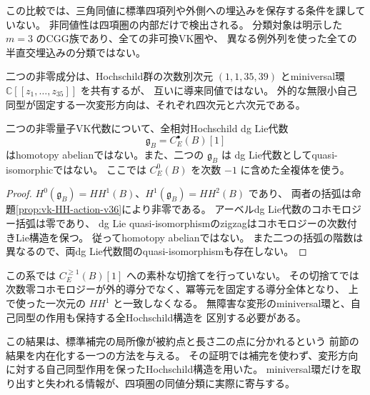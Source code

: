 この比較では、三角同値に標準四項列や外側への埋込みを保存する条件を課していない。
非同値性は四項圏の内部だけで検出される。
分類対象は明示した $m=3$ のCGG族であり、全ての非可換VK圏や、
異なる例外列を使った全ての半直交埋込みの分類ではない。

\begin{corollary}[同じ滑らかな変形環を持つ非同値なVK圏]
\label{cor:vk-same-hull-distinct-action-v36}
二つの非零成分は、Hochschild群の次数別次元
$(1,1,35,39)$ とminiversal環 $\mathbb C[[z_1,\ldots,z_{35}]]$ を共有するが、
互いに導来同値ではない。
外的な無限小自己同型が固定する一次変形方向は、それぞれ四次元と六次元である。
\end{corollary}

\begin{corollary}
\label{cor:vk-not-homotopy-abelian-v36}
二つの非零量子VK代数について、全相対Hochschild dg Lie代数
\[
 \mathfrak g_B=C_E^\bullet(B)[1]
\]
はhomotopy abelianではない。また、二つの $\mathfrak g_B$ は
 dg Lie代数としてquasi-isomorphicではない。
ここでは $C_E^0(B)$ を次数 $-1$ に含めた全複体を使う。
\end{corollary}

\begin{proof}
$H^0(\mathfrak g_B)=HH^1(B)$、$H^1(\mathfrak g_B)=HH^2(B)$ であり、
両者の括弧は命題\ref{prop:vk-HH-action-v36}により非零である。
アーベルdg Lie代数のコホモロジー括弧は零であり、
dg Lie quasi-isomorphismのzigzagはコホモロジーの次数付きLie構造を保つ。
従ってhomotopy abelianではない。
また二つの括弧の階数は異なるので、両dg Lie代数間のquasi-isomorphismも存在しない。
\end{proof}

この系では $C_E^{\ge1}(B)[1]$ への素朴な切捨てを行っていない。
その切捨てでは次数零コホモロジーが外的導分でなく、冪等元を固定する導分全体となり、
上で使った一次元の $HH^1$ と一致しなくなる。
無障害な変形のminiversal環と、自己同型の作用も保持する全Hochschild構造を
区別する必要がある。

この結果は、標準補完の局所像が被約点と長さ二の点に分かれるという
前節の結果を内在化する一つの方法を与える。
その証明では補完を使わず、変形方向に対する自己同型作用を保ったHochschild構造を用いた。
miniversal環だけを取り出すと失われる情報が、四項圏の同値分類に実際に寄与する。
